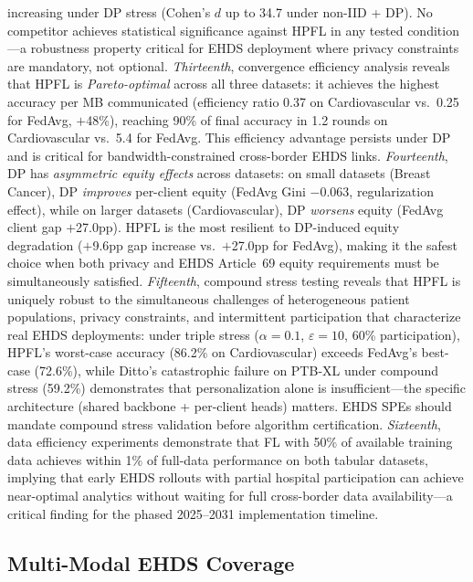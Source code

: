 \documentclass[conference,a4paper]{IEEEtran}
\begin{document}
increasing under DP stress (Cohen's $d$ up to 34.7 under non-IID + DP). No competitor achieves statistical significance against HPFL in any tested condition---a robustness property critical for EHDS deployment where privacy constraints are mandatory, not optional. \textit{Thirteenth}, convergence efficiency analysis reveals that HPFL is \textit{Pareto-optimal} across all three datasets: it achieves the highest accuracy per MB communicated (efficiency ratio 0.37 on Cardiovascular vs.\ 0.25 for FedAvg, $+$48\%), reaching 90\% of final accuracy in 1.2 rounds on Cardiovascular vs.\ 5.4 for FedAvg. This efficiency advantage persists under DP and is critical for bandwidth-constrained cross-border EHDS links. \textit{Fourteenth}, DP has \textit{asymmetric equity effects} across datasets: on small datasets (Breast Cancer), DP \textit{improves} per-client equity (FedAvg Gini $-$0.063, regularization effect), while on larger datasets (Cardiovascular), DP \textit{worsens} equity (FedAvg client gap $+$27.0pp). HPFL is the most resilient to DP-induced equity degradation ($+$9.6pp gap increase vs.\ $+$27.0pp for FedAvg), making it the safest choice when both privacy and EHDS Article~69 equity requirements must be simultaneously satisfied. \textit{Fifteenth}, compound stress testing reveals that HPFL is uniquely robust to the simultaneous challenges of heterogeneous patient populations, privacy constraints, and intermittent participation that characterize real EHDS deployments: under triple stress ($\alpha{=}0.1$, $\varepsilon{=}10$, 60\% participation), HPFL's worst-case accuracy (86.2\% on Cardiovascular) exceeds FedAvg's best-case (72.6\%), while Ditto's catastrophic failure on PTB-XL under compound stress (59.2\%) demonstrates that personalization alone is insufficient---the specific architecture (shared backbone + per-client heads) matters. EHDS SPEs should mandate compound stress validation before algorithm certification. \textit{Sixteenth}, data efficiency experiments demonstrate that FL with 50\% of available training data achieves within 1\% of full-data performance on both tabular datasets, implying that early EHDS rollouts with partial hospital participation can achieve near-optimal analytics without waiting for full cross-border data availability---a critical finding for the phased 2025--2031 implementation timeline.

\subsection{Multi-Modal EHDS Coverage}
\end{document}
